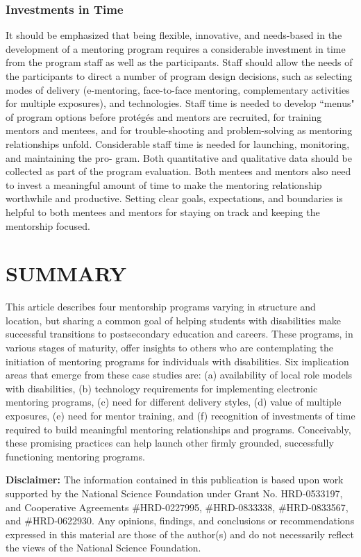 \documentclass[11.5pt]{sig-alternate} %
\begin{document}
\begin{large}
\subsubsection*{Investments in Time}
It should be emphasized that being flexible, innovative, and needs-based in the development of a mentoring program requires a considerable investment in time from the program staff as well as the participants. Staff should allow the needs of the participants to direct a number of program design decisions, such as selecting modes of delivery (e-mentoring, face-to-face mentoring, complementary activities for multiple exposures), and technologies. Staff time is needed to develop ``menus" of program options before protégés and mentors are recruited, for training mentors and mentees, and for trouble-shooting and problem-solving as mentoring relationships unfold. Considerable staff time is needed for launching, monitoring, and maintaining the pro- gram. Both quantitative and qualitative data should be collected as part of the program evaluation. Both mentees and mentors also need to invest a meaningful amount of time to make the mentoring relationship worthwhile and productive. Setting clear goals, expectations, and boundaries is helpful to both mentees and mentors for staying on track and keeping the mentorship focused.

\section*{SUMMARY}
This article describes four mentorship programs varying in structure and location, but sharing a common goal of helping students with disabilities make successful transitions to postsecondary education and careers. These programs, in various stages of maturity, offer insights to others who are contemplating the initiation of mentoring programs for individuals with disabilities. Six implication areas that emerge from these case studies are: (a) availability of local role models with disabilities, (b) technology requirements for implementing electronic mentoring programs, (c) need for different delivery styles, (d) value of multiple exposures, (e) need for mentor training, and (f) recognition of investments of time required to build meaningful mentoring relationships and programs. Conceivably, these promising practices can help launch other firmly grounded, successfully functioning mentoring programs.

\textbf{Disclaimer:} The information contained in this publication is based upon work supported by the National Science Foundation under Grant No. HRD-0533197, and Cooperative Agreements \#HRD-0227995, \#HRD-0833338, \#HRD-0833567, and \#HRD-0622930. Any opinions, findings, and conclusions or recommendations expressed in this material are those of the author(s) and do not necessarily reflect the views of the National Science Foundation.


\end{large}
\end{document}
